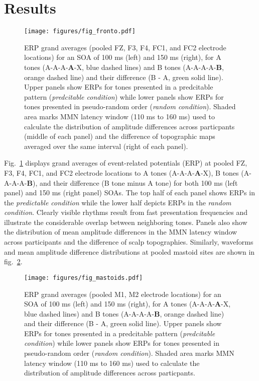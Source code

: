\documentclass[twoside, man, a4paper,12pt, nofontenc]{apa7}
\begin{document}
\newpage

\hypertarget{results}{%
\section{Results}\label{results}}

\begin{figure}
\hypertarget{fig:fronto}{%
\centering
\texttt{[image: figures/fig\_fronto.pdf]}
\caption{ERP grand averages (pooled FZ, F3, F4, FC1, and FC2 electrode
locations) for an SOA of 100 ms (left) and 150 ms (right), for A tones
(A-A-A-\textbf{A}-X, blue dashed lines) and B tones (A-A-A-A-\textbf{B},
orange dashed line) and their difference (B - A, green solid line).
Upper panels show ERPs for tones presented in a predcitable pattern
(\emph{predcitable condition}) while lower panels show ERPs for tones
presented in pseudo-random order (\emph{random condition}). Shaded area
marks MMN latency window (110 ms to 160 ms) used to calculate the
distribution of amplitude differences across particpants (middle of each
panel) and the difference of topographic maps averaged over the same
interval (right of each panel).}\label{fig:fronto}
}
\end{figure}

Fig.~\ref{fig:fronto} displays grand averages of event-related
potentials (ERP) at pooled FZ, F3, F4, FC1, and FC2 electrode locations
to A tones (A-A-A-\textbf{A}-X), B tones (A-A-A-A-\textbf{B}), and their
difference (B tone minus A tone) for both 100 ms (left panel) and 150 ms
(right panel) SOAs. The top half of each panel shows ERPs in the
\emph{predictable condition} while the lower half depicts ERPs in the
\emph{random condition}. Clearly visible rhythms result from fast
presentation frequencies and illustrate the considerable overlap between
neighboring tones. Panels also show the distribution of mean amplitude
differences in the MMN latency window across participants and the
difference of scalp topographies. Similarly, waveforms and mean
amplitude difference distributions at pooled mastoid sites are shown in
fig.~\ref{fig:mastoids}.

\begin{figure}
\hypertarget{fig:mastoids}{%
\centering
\texttt{[image: figures/fig\_mastoids.pdf]}
\caption{ERP grand averages (pooled M1, M2 electrode locations) for an
SOA of 100 ms (left) and 150 ms (right), for A tones
(A-A-A-\textbf{A}-X, blue dashed lines) and B tones (A-A-A-A-\textbf{B},
orange dashed line) and their difference (B - A, green solid line).
Upper panels show ERPs for tones presented in a predcitable pattern
(\emph{predcitable condition}) while lower panels show ERPs for tones
presented in pseudo-random order (\emph{random condition}). Shaded area
marks MMN latency window (110 ms to 160 ms) used to calculate the
distribution of amplitude differences across
particpants.}\label{fig:mastoids}
}
\end{figure}
\end{document}
